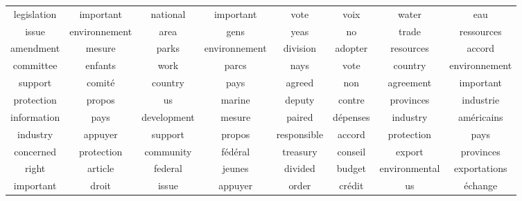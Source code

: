 \documentclass{article}
\begin{document}
\begin{table*}[t]
\centering  
\begin{tabular}{cc|cc|cc|cc} 
          legislation &            important &              national &            important &                  vote &                 voix &                 water &                  eau  \\ 
                 issue &        environnement &                  area &                 gens &                  yeas &                   no &                 trade &           ressources  \\ 
             amendment &               mesure &                 parks &        environnement &              division &              adopter &             resources &               accord  \\ 
             committee &              enfants &                  work &                parcs &                  nays &                 vote &               country &        environnement  \\ 
               support &              comit\'e &               country &                 pays &                agreed &                  non &             agreement &            important  \\ 
            protection &               propos &                    us &               marine &                deputy &               contre &             provinces &            industrie  \\ 
           information &                 pays &           development &               mesure &                paired &            d\'epenses &              industry &          am\'ericains  \\ 
              industry &              appuyer &               support &               propos &           responsible &               accord &            protection &                 pays  \\ 
             concerned &           protection &             community &            f\'ed\'eral &              treasury &              conseil &                export &            provinces  \\ 
                 right &              article &               federal &               jeunes &               divided &               budget &         environmental &         exportations  \\ 
             important &                droit &                 issue &              appuyer &                 order &              cr\'edit &                    us &             \'echange  \\ 

\end{tabular}
\end{table*}
\end{document}
